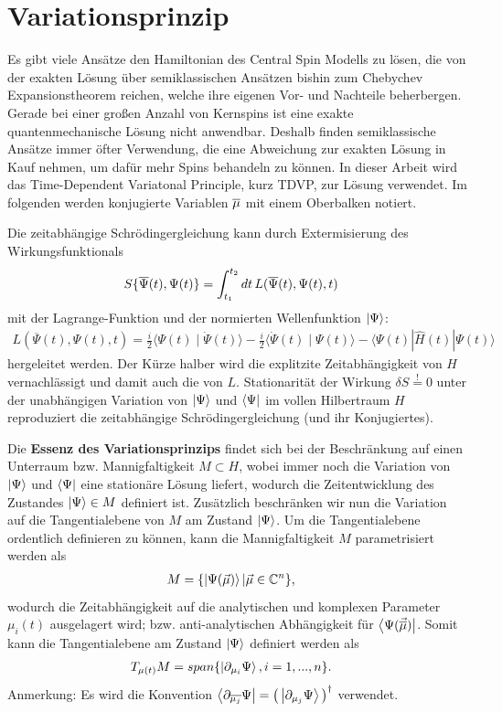 \chapter{Variationsprinzip}
Es gibt viele Ansätze den Hamiltonian des Central Spin Modells zu lösen, die von der exakten Lösung über 
semiklassischen Ansätzen\cite{PhysRevB.65.205309,PhysRevB.94.094308,PhysRevB.70.205327,NatalieJaeschke} bishin zum
Chebychev Expansionstheorem reichen\cite{PhysRevB.89.045317}, welche ihre eigenen Vor- und Nachteile beherbergen. 
Gerade bei einer großen Anzahl von Kernspins ist eine exakte quantenmechanische Lösung nicht anwendbar. Deshalb finden semiklassische Ansätze immer öfter Verwendung, 
die eine Abweichung zur exakten Lösung in Kauf nehmen, um dafür mehr Spins behandeln zu können. In dieser Arbeit wird das Time-Dependent Variatonal 
Principle, kurz TDVP, zur Lösung verwendet. Im folgenden werden konjugierte Variablen $\overline{\mu}$ mit einem Oberbalken notiert.

Die zeitabhängige Schrödingergleichung kann durch Extermisierung des Wirkungsfunktionals
\begin{align}
    S\{\overline{\Psi}(t),\Psi(t)\} &=  \int_{t_1}^{t_2}dt \thinspace L(\overline{\Psi}(t),\Psi(t),t)
\end{align}
mit der Lagrange-Funktion und der normierten Wellenfunktion $\ket{\Psi}$:
\begin{align}\label{Lagrange}
    L\left(\overline{\Psi}(t), \Psi(t), t\right)=\frac{i}{2}\langle\Psi(t) \mid \dot{\Psi}(t)\rangle-\frac{i}{2}\langle\dot{\Psi}(t) \mid \Psi(t)\rangle-\langle\Psi(t)|\hat{H}(t)| \Psi(t)\rangle
\end{align}
hergeleitet werden. Der Kürze halber wird die explitzite Zeitabhängigkeit von $H$ vernachlässigt und damit auch die von $L$. Stationarität der Wirkung 
$\delta S \overset{!}{=} 0$ unter der unabhängigen Variation von $\ket{\Psi}$ und $\bra{\Psi}$ im vollen Hilbertraum $H$ reproduziert die zeitabhängige 
Schrödingergleichung (und ihr Konjugiertes).\

Die \textbf{Essenz des Variationsprinzips} findet sich bei der Beschränkung auf einen Unterraum bzw. Mannigfaltigkeit $M\subset H$, wobei 
immer noch die Variation von $\ket{\Psi}$ und $\bra{\Psi}$ eine stationäre Lösung liefert, wodurch die Zeitentwicklung des Zustandes $\ket{\Psi} \in M$
definiert ist. Zusätzlich beschränken wir nun die Variation auf die Tangentialebene von $M$ am Zustand $\ket{\Psi}$. Um die Tangentialebene ordentlich 
definieren zu können, kann die Mannigfaltigkeit $M$ parametrisiert werden als   
\begin{align}
    M &= \{\ket{\Psi(\vec{\mu})}|\vec{\mu}\in \mathbb{C}^n\},
\end{align}
wodurch die Zeitabhängigkeit auf die analytischen und komplexen Parameter $\mu_i(t)$ ausgelagert wird; bzw. anti-analytischen Abhängigkeit für 
$\bra{\Psi(\vec{\overline{\mu}})}$. Somit kann die Tangentialebene am Zustand $\ket{\Psi}$ definiert werden als  
\begin{align}
    T_{\mu(t)}M &= span\{\ket{\partial_{\mu_i}\Psi}, i = 1,...,n\}.
\end{align}
Anmerkung: Es wird die Konvention $\bra{\partial_{\overline{\mu_j}}\Psi} = \left(\thinspace\ket{\partial_{\mu_j}\Psi}\thinspace\right)^\dagger$ verwendet.

